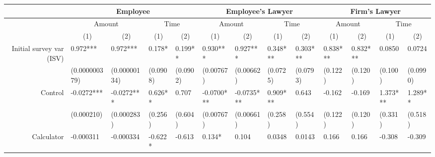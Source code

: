 \begin{tabular}{rrrrrrrrrrrrr}
\toprule
      & \multicolumn{4}{c}{Employee}  & \multicolumn{4}{c}{Employee's Lawyer} & \multicolumn{4}{c}{Firm's Lawyer} \\
\midrule
      & \multicolumn{2}{c}{Amount} & \multicolumn{2}{c}{Time} & \multicolumn{2}{c}{Amount} & \multicolumn{2}{c}{Time} & \multicolumn{2}{c}{Amount} & \multicolumn{2}{c}{Time} \\
      & \multicolumn{1}{c}{(1)} & \multicolumn{1}{c}{(2)} & \multicolumn{1}{c}{(1)} & \multicolumn{1}{c}{(2)} & \multicolumn{1}{c}{(1)} & \multicolumn{1}{c}{(2)} & \multicolumn{1}{c}{(1)} & \multicolumn{1}{c}{(2)} & \multicolumn{1}{c}{(1)} & \multicolumn{1}{c}{(2)} & \multicolumn{1}{c}{(1)} & \multicolumn{1}{c}{(2)} \\
Initial survey var (ISV) & \multicolumn{1}{l}{0.972***} & \multicolumn{1}{l}{0.972***} & \multicolumn{1}{l}{0.178*} & \multicolumn{1}{l}{0.199**} & \multicolumn{1}{l}{0.930***} & \multicolumn{1}{l}{0.927***} & \multicolumn{1}{l}{0.348***} & \multicolumn{1}{l}{0.303***} & \multicolumn{1}{l}{0.838***} & \multicolumn{1}{l}{0.832***} & \multicolumn{1}{l}{0.0850} & \multicolumn{1}{l}{0.0724} \\
      & \multicolumn{1}{l}{(0.000000379)} & \multicolumn{1}{l}{(0.00000134)} & \multicolumn{1}{l}{(0.0908)} & \multicolumn{1}{l}{(0.0902)} & \multicolumn{1}{l}{(0.00767)} & \multicolumn{1}{l}{(0.00662)} & \multicolumn{1}{l}{(0.0725)} & \multicolumn{1}{l}{(0.0793)} & \multicolumn{1}{l}{(0.122)} & \multicolumn{1}{l}{(0.120)} & \multicolumn{1}{l}{(0.100)} & \multicolumn{1}{l}{(0.0990)} \\
Control & \multicolumn{1}{l}{-0.0272***} & \multicolumn{1}{l}{-0.0272***} & \multicolumn{1}{l}{0.626**} & \multicolumn{1}{l}{0.707} & \multicolumn{1}{l}{-0.0700***} & \multicolumn{1}{l}{-0.0735***} & \multicolumn{1}{l}{0.909***} & \multicolumn{1}{l}{0.643} & \multicolumn{1}{l}{-0.162} & \multicolumn{1}{l}{-0.169} & \multicolumn{1}{l}{1.373***} & \multicolumn{1}{l}{1.289**} \\
      & \multicolumn{1}{l}{(0.000210)} & \multicolumn{1}{l}{(0.000283)} & \multicolumn{1}{l}{(0.256)} & \multicolumn{1}{l}{(0.604)} & \multicolumn{1}{l}{(0.00767)} & \multicolumn{1}{l}{(0.00661)} & \multicolumn{1}{l}{(0.258)} & \multicolumn{1}{l}{(0.554)} & \multicolumn{1}{l}{(0.122)} & \multicolumn{1}{l}{(0.120)} & \multicolumn{1}{l}{(0.331)} & \multicolumn{1}{l}{(0.518)} \\
Calculator & \multicolumn{1}{l}{-0.000311} & \multicolumn{1}{l}{-0.000334} & \multicolumn{1}{l}{-0.622*} & \multicolumn{1}{l}{-0.613} & \multicolumn{1}{l}{0.134*} & \multicolumn{1}{l}{0.104} & \multicolumn{1}{l}{0.0348} & \multicolumn{1}{l}{0.0143} & \multicolumn{1}{l}{0.166} & \multicolumn{1}{l}{0.166} & \multicolumn{1}{l}{-0.308} & \multicolumn{1}{l}{-0.309} \\

\end{tabular}
